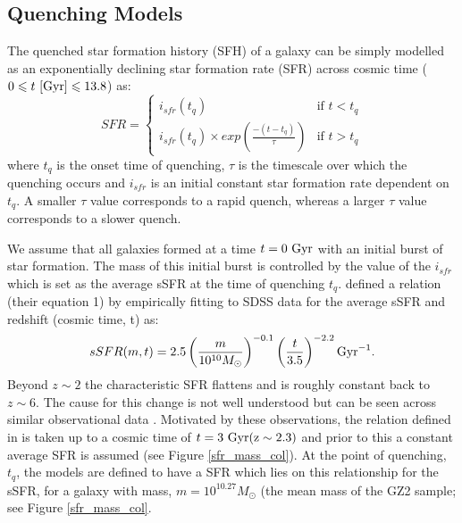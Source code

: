 \documentclass[useAMS,usenatbib]{mn2e}
\def\changed    {\color{titlecol} }
\begin{document}
\subsection{Quenching Models}\label{sfh}

The quenched star formation history (SFH) of a galaxy can be simply modelled as an exponentially declining star formation rate (SFR) across cosmic time ($0 \leq t ~\rm{[Gyr]} \leq 13.8$) as:
\begin{equation}\label{sfh}
SFR =
\begin{cases}
i_{sfr}(t_q) & \text{if } t < t_q \\
i_{sfr}(t_q) \times exp{\left( \frac{-(t-t_{q})}{\tau}\right)} & \text{if } t > t_q 
\end{cases}
\end{equation}
where $t_{q}$ is the onset time of quenching, $\tau$ is the timescale over which the quenching occurs and $i_{sfr}$ is an initial constant star formation rate dependent on $t_q$.  A smaller $\tau$ value corresponds to a rapid quench, whereas a larger $\tau$ value corresponds to a slower quench. 

We assume that all galaxies formed at a time $t=0~\rm{Gyr}$ with an initial burst of star formation. The mass of this initial burst is controlled by the value of the $i_{sfr}$ which is set as the average sSFR at the time of quenching $t_q$. \citet{Peng} defined a relation (their equation 1) by {\changed empirically fitting to SDSS data for the average sSFR and redshift (cosmic time, t)} as:
\begin{equation}
sSFR(m,t) = 2.5 \left( \frac{m}{10^{10} M_{\odot}} \right)^{-0.1} \left(\frac{t}{3.5}\right)^{-2.2} \rm{Gyr}^{-1}.
\end{equation}
Beyond $z \sim 2$ the characteristic SFR flattens and is roughly constant back to $z\sim6$. The cause for this change is not well understood but can be seen across similar observational data \citep{Peng, Gonzalez, Beth}. Motivated by these observations, the relation defined in \citet{Peng} is taken up to a cosmic time of $t=3~\rm{Gyr} (z \sim 2.3)$ and prior to this a constant average SFR is assumed (see Figure \ref{sfr_mass_col}). At the point of quenching, $t_{q}$, the models are defined to have a SFR which lies on this relationship for the sSFR, for a galaxy with mass, $m = 10^{10.27} M_{\odot}$ (the mean mass of the GZ2 sample; see Figure \ref{sfr_mass_col}.
 
\end{document}

